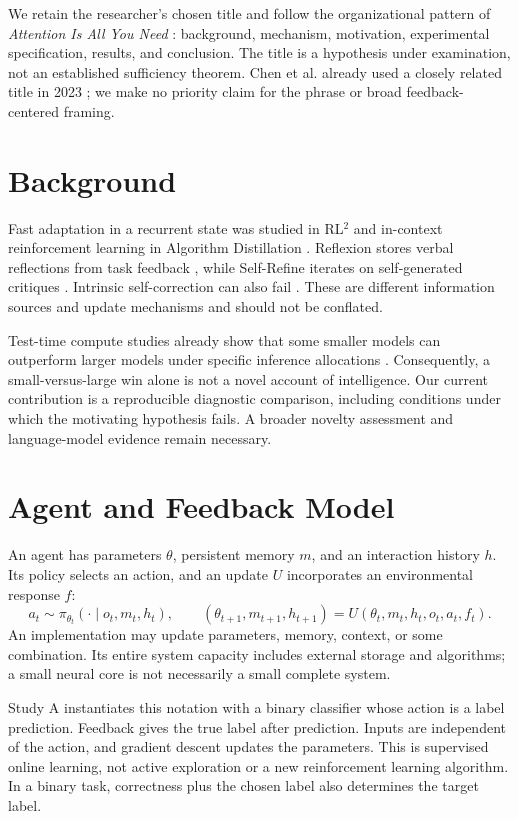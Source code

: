 \documentclass[11pt]{article}
\begin{document}
We retain the researcher's chosen title and follow the organizational pattern
of \emph{Attention Is All You Need} \cite{vaswani}: background, mechanism,
motivation, experimental specification, results, and conclusion. The title is
a hypothesis under examination, not an established sufficiency theorem.
Chen et al. already used a closely related title in 2023 \cite{chen}; we make
no priority claim for the phrase or broad feedback-centered framing.

\section{Background}
Fast adaptation in a recurrent state was studied in RL$^2$ \cite{duan} and
in-context reinforcement learning in Algorithm Distillation \cite{laskin}.
Reflexion stores verbal reflections from task feedback \cite{shinn}, while
Self-Refine iterates on self-generated critiques \cite{madaan}. Intrinsic
self-correction can also fail \cite{huang}. These are different information
sources and update mechanisms and should not be conflated.

Test-time compute studies already show that some smaller models can outperform
larger models under specific inference allocations \cite{snell}. Consequently,
a small-versus-large win alone is not a novel account of intelligence. Our
current contribution is a reproducible diagnostic comparison, including
conditions under which the motivating hypothesis fails. A broader novelty
assessment and language-model evidence remain necessary.

\section{Agent and Feedback Model}
An agent has parameters $\theta$, persistent memory $m$, and an interaction
history $h$. Its policy selects an action, and an update $U$ incorporates an
environmental response $f$:
\[
 a_t\sim\pi_{\theta_t}(\cdot\mid o_t,m_t,h_t),\qquad
 (\theta_{t+1},m_{t+1},h_{t+1})=U(\theta_t,m_t,h_t,o_t,a_t,f_t).
\]
An implementation may update parameters, memory, context, or some combination.
Its entire system capacity includes external storage and algorithms; a small
neural core is not necessarily a small complete system.

Study A instantiates this notation with a binary classifier whose action is a
label prediction. Feedback gives the true label after prediction. Inputs are
independent of the action, and gradient descent updates the parameters. This
is supervised online learning, not active exploration or a new reinforcement
learning algorithm. In a binary task, correctness plus the chosen label also
determines the target label.
\end{document}
